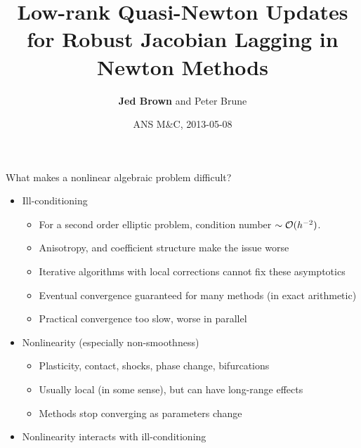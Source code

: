 \documentclass{beamer}
\title{Low-rank Quasi-Newton Updates for Robust Jacobian Lagging in Newton Methods}
\author{{\bf Jed Brown} and Peter Brune}
\institute
{
  {Mathematics and Computer Science Division, Argonne National Laboratory}
}
\date{ANS M\&C, 2013-05-08}
\begin{document}
\lstset{language=C}
\normalem

\begin{frame}
  \titlepage
\end{frame}

\begin{frame}{What makes a nonlinear algebraic problem difficult?}
  \begin{itemize}
  \item Ill-conditioning
    \begin{itemize}
    \item For a second order elliptic problem, condition number $\sim \mathcal{O}(h^{-2})$.
    \item Anisotropy, and coefficient structure make the issue worse
    \item Iterative algorithms with local corrections cannot fix these asymptotics
    \item Eventual convergence guaranteed for many methods (in exact arithmetic)
    \item Practical convergence too slow, worse in parallel
    \end{itemize}
  \item Nonlinearity (especially non-smoothness)
    \begin{itemize}
    \item Plasticity, contact, shocks, phase change, bifurcations
    \item Usually local (in some sense), but can have long-range effects
    \item Methods stop converging as parameters change
    \end{itemize}
  \item<2> Nonlinearity interacts with ill-conditioning
  \end{itemize}
\end{frame}
\end{document}
